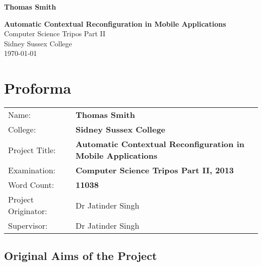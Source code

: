\documentclass[12pt,twoside,notitlepage]{report}
\newcommand{\disstitle}{Automatic Contextual Reconfiguration in Mobile Applications}
\newcommand{\wordcount}{11038}
\begin{document}





\pagestyle{empty}

\hfill{\LARGE \bf Thomas Smith}

\vspace*{60mm}
\begin{center}
\Huge
{\bf \disstitle} \\
\vspace*{5mm}
Computer Science Tripos Part II \\
\vspace*{5mm}
Sidney Sussex College \\
\vspace*{5mm}
\today  %
\end{center}

\cleardoublepage


\setcounter{page}{1}
\pagestyle{plain}

\chapter*{Proforma}

{\large
\begin{tabular}{l p{9.5cm}}
Name:               & \bf Thomas Smith	\\
College:            & \bf Sidney Sussex College	\\
Project Title:      & \bf \disstitle	\\
Examination:        & \bf Computer Science Tripos Part II, 2013 	\\
Word Count:         & \bf\wordcount\footnotemark[1] \\
Project Originator: & Dr Jatinder Singh		\\
Supervisor:         & Dr Jatinder Singh		\\ 
\end{tabular}
}



\section*{Original Aims of the Project}
\end{document}
